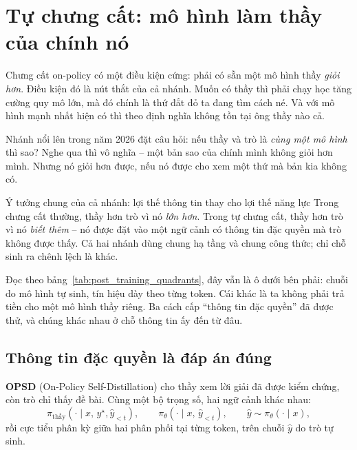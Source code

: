 
\section{Tự chưng cất: mô hình làm thầy của chính nó}
\label{sec:self_distillation}

Chưng cất on-policy có một điều kiện cứng: phải có sẵn một mô hình thầy \emph{giỏi hơn}. Điều kiện đó là nút thắt của cả nhánh. Muốn có thầy thì phải chạy học tăng cường quy mô lớn, mà đó chính là thứ đắt đỏ ta đang tìm cách né. Và với mô hình mạnh nhất hiện có thì theo định nghĩa không tồn tại ông thầy nào cả.

Nhánh nổi lên trong năm 2026 đặt câu hỏi: nếu thầy và trò là \emph{cùng một mô hình} thì sao? Nghe qua thì vô nghĩa -- một bản sao của chính mình không giỏi hơn mình. Nhưng nó giỏi hơn được, nếu nó được cho xem một thứ mà bản kia không có.

\begin{keyidea}{Ý tưởng chung của cả nhánh: lợi thế thông tin thay cho lợi thế năng lực}
Trong chưng cất thường, thầy hơn trò vì nó \emph{lớn hơn}. Trong tự chưng cất, thầy hơn trò vì nó \emph{biết thêm} -- nó được đặt vào một ngữ cảnh có thông tin đặc quyền mà trò không được thấy. Cả hai nhánh dùng chung hạ tầng và chung công thức; chỉ chỗ sinh ra chênh lệch là khác.
\end{keyidea}

Đọc theo bảng~\ref{tab:post_training_quadrants}, đây vẫn là ô dưới bên phải: chuỗi do mô hình tự sinh, tín hiệu dày theo từng token. Cái khác là ta không phải trả tiền cho một mô hình thầy riêng. Ba cách cấp ``thông tin đặc quyền'' đã được thử, và chúng khác nhau ở chỗ thông tin ấy đến từ đâu.

\subsection{Thông tin đặc quyền là đáp án đúng}
\label{ssec:opsd}

\textbf{OPSD} (On-Policy Self-Distillation) \cite{zhao2026opsd} cho thầy xem lời giải đã được kiểm chứng, còn trò chỉ thấy đề bài. Cùng một bộ trọng số, hai ngữ cảnh khác nhau:
\[
\pi_{\text{thầy}}(\cdot \mid x,\, y^\star, \hat{y}_{<t}), \qquad
\pi_\theta(\cdot \mid x,\, \hat{y}_{<t}), \qquad
\hat{y} \sim \pi_\theta(\cdot \mid x),
\]
rồi cực tiểu phân kỳ giữa hai phân phối tại từng token, trên chuỗi $\hat{y}$ do trò tự sinh.

